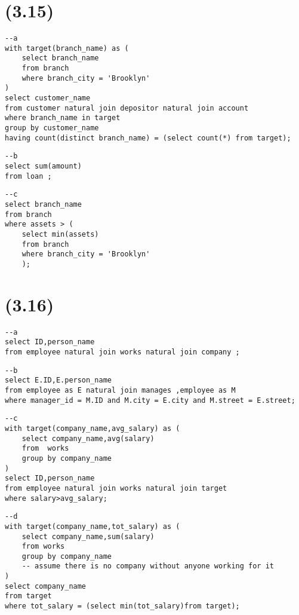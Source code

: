 \documentclass[a4paper]{article}
\begin{document}
\section{(3.15)}
\begin{lstlisting}
--a
with target(branch_name) as (
    select branch_name
    from branch
    where branch_city = 'Brooklyn'
)
select customer_name
from customer natural join depositor natural join account
where branch_name in target
group by customer_name
having count(distinct branch_name) = (select count(*) from target);
\end{lstlisting}

\begin{lstlisting}
--b
select sum(amount)
from loan ;
\end{lstlisting}

\begin{lstlisting}
--c
select branch_name
from branch
where assets > (
    select min(assets)
    from branch
    where branch_city = 'Brooklyn'
    );
\end{lstlisting}
\section{(3.16)}
\begin{lstlisting}
--a
select ID,person_name
from employee natural join works natural join company ;
\end{lstlisting}

\begin{lstlisting}
--b
select E.ID,E.person_name
from employee as E natural join manages ,employee as M
where manager_id = M.ID and M.city = E.city and M.street = E.street;
\end{lstlisting}

\begin{lstlisting}
--c
with target(company_name,avg_salary) as (
    select company_name,avg(salary)
    from  works
    group by company_name
)
select ID,person_name
from employee natural join works natural join target
where salary>avg_salary;
\end{lstlisting}

\begin{lstlisting}
--d
with target(company_name,tot_salary) as (
    select company_name,sum(salary)
    from works
    group by company_name
    -- assume there is no company without anyone working for it
)
select company_name
from target
where tot_salary = (select min(tot_salary)from target);
\end{lstlisting}
\end{document}
